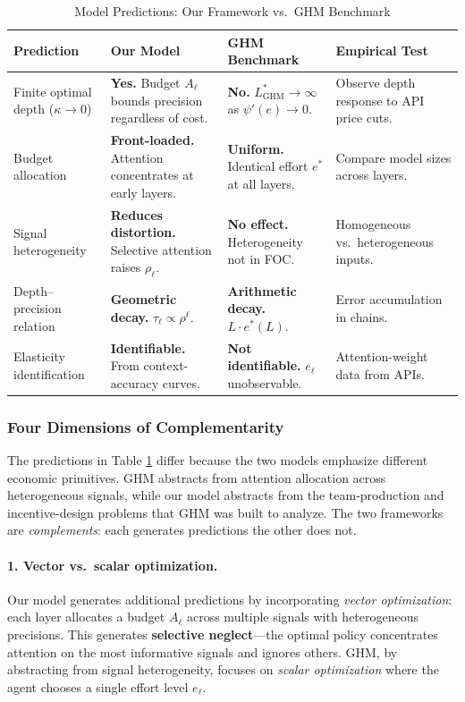 \begin{table}[htbp]
\centering
\footnotesize
\setlength{\tabcolsep}{5pt}
\caption{Model Predictions: Our Framework vs.~GHM Benchmark}
\label{tab:prediction_comparison}
\begin{tabular}{@{}>{\raggedright\arraybackslash}p{2.8cm}>{\raggedright\arraybackslash}p{3.5cm}>{\raggedright\arraybackslash}p{3.5cm}>{\raggedright\arraybackslash}p{3.5cm}@{}}
\toprule
\textbf{Prediction} & \textbf{Our Model} & \textbf{GHM Benchmark} & \textbf{Empirical Test} \\
\midrule
Finite optimal depth ($\kappa \to 0$) & \textbf{Yes.} Budget $A_\ell$ bounds precision regardless of cost. & \textbf{No.} $L^*_{\text{GHM}} \to \infty$ as $\psi'(e) \to 0$. & Observe depth response to API price cuts. \\
Budget allocation & \textbf{Front-loaded.} Attention concentrates at early layers. & \textbf{Uniform.} Identical effort $e^*$ at all layers. & Compare model sizes across layers. \\
Signal heterogeneity & \textbf{Reduces distortion.} Selective attention raises $\rho_\ell$. & \textbf{No effect.} Heterogeneity not in FOC. & Homogeneous vs.~heterogeneous inputs. \\
Depth--precision relation & \textbf{Geometric decay.} $\tau_\ell \propto \rho^{\ell}$. & \textbf{Arithmetic decay.} $L \cdot e^*(L)$. & Error accumulation in chains. \\
Elasticity identification & \textbf{Identifiable.} From context-accuracy curves. & \textbf{Not identifiable.} $e_\ell$ unobservable. & Attention-weight data from APIs. \\
\bottomrule
\end{tabular}
\end{table}

\subsubsection{Four Dimensions of Complementarity}
\label{sec:key_distinctions}

The predictions in Table \ref{tab:prediction_comparison} differ because the two models emphasize different economic primitives. GHM abstracts from attention allocation across heterogeneous signals, while our model abstracts from the team-production and incentive-design problems that GHM was built to analyze. The two frameworks are \emph{complements}: each generates predictions the other does not.

\paragraph{1. Vector vs.~scalar optimization.} Our model generates additional predictions by incorporating \emph{vector optimization}: each layer allocates a budget $A_\ell$ across multiple signals with heterogeneous precisions. This generates \textbf{selective neglect}---the optimal policy concentrates attention on the most informative signals and ignores others. GHM, by abstracting from signal heterogeneity, focuses on \emph{scalar optimization} where the agent chooses a single effort level $e_\ell$.

